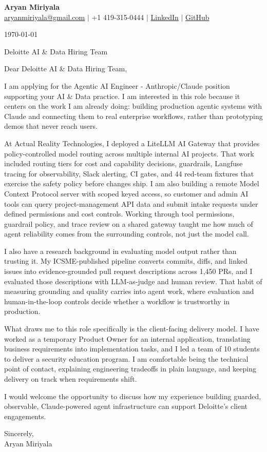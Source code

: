 \documentclass[letterpaper,11pt]{article}
\begin{document}
{\Large\textbf{Aryan Miriyala}}\\
\href{mailto:aryanmiriyala@gmail.com}{aryanmiriyala@gmail.com} $|$ +1 419-315-0444 $|$
\href{https://www.linkedin.com/in/aryan-miriyala-7788a21b6/}{LinkedIn} $|$
\href{https://github.com/aryanmiriyala}{GitHub}

\today

Deloitte AI \& Data Hiring Team

Dear Deloitte AI \& Data Hiring Team,

I am applying for the Agentic AI Engineer - Anthropic/Claude position supporting your AI \& Data practice. I am interested in this role because it centers on the work I am already doing: building production agentic systems with Claude and connecting them to real enterprise workflows, rather than prototyping demos that never reach users.

At Actual Reality Technologies, I deployed a LiteLLM AI Gateway that provides policy-controlled model routing across multiple internal AI projects. That work included routing tiers for cost and capability decisions, guardrails, Langfuse tracing for observability, Slack alerting, CI gates, and 44 red-team fixtures that exercise the safety policy before changes ship. I am also building a remote Model Context Protocol server with scoped keyed access, so customer and admin AI tools can query project-management API data and submit intake requests under defined permissions and cost controls. Working through tool permissions, guardrail policy, and trace review on a shared gateway taught me how much of agent reliability comes from the surrounding controls, not just the model call.

I also have a research background in evaluating model output rather than trusting it. My ICSME-published pipeline converts commits, diffs, and linked issues into evidence-grounded pull request descriptions across 1,450 PRs, and I evaluated those descriptions with LLM-as-judge and human review. That habit of measuring grounding and quality carries into agent work, where evaluation and human-in-the-loop controls decide whether a workflow is trustworthy in production.

What draws me to this role specifically is the client-facing delivery model. I have worked as a temporary Product Owner for an internal application, translating business requirements into implementation tasks, and I led a team of 10 students to deliver a security education program. I am comfortable being the technical point of contact, explaining engineering tradeoffs in plain language, and keeping delivery on track when requirements shift.

I would welcome the opportunity to discuss how my experience building guarded, observable, Claude-powered agent infrastructure can support Deloitte's client engagements.

Sincerely,\\
Aryan Miriyala
\end{document}
